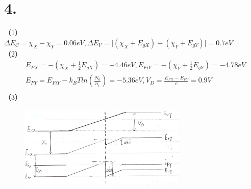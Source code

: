 \documentclass[UTF8]{ctexart}
\begin{document}
\section*{4.}
（1）\\
$\Delta E_C=\chi_X-\chi_Y = 0.06eV, \Delta E_V=\lvert(\chi_X+E_{gX})-(\chi_Y+E_{gY})\rvert = 0.7eV$\\
（2）
\begin{equation*}
    \begin{aligned}
        & E_{FX}=-(\chi_X+\frac{1}{2}E_{gX})=-4.46eV,E_{FiY}=-(\chi_Y+\frac{1}{2}E_{gY})=-4.78eV\\
        & E_{FY}=E_{FiY}-k_BTln(\frac{N_a}{n_i})=-5.36eV, V_D=\frac{E_{FX}-E_{FY}}{e}=0.9V\\
    \end{aligned}
\end{equation*}
（3）
\begin{figure}[H]                                        
    \centering                                                
    \includegraphics[width=8cm,height=4cm]{4-3.jpg}        
    \caption*{}                                                                                  
\end{figure}     
\end{document}
